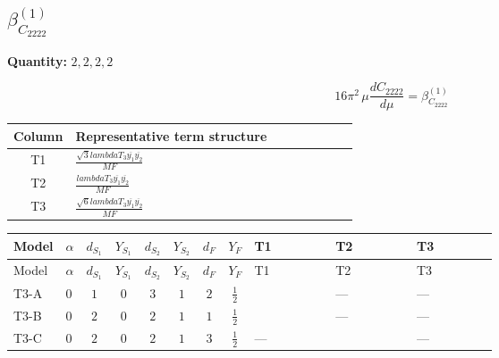 \documentclass[8pt]{article}
\begin{document}
\begin{landscape}
\section*{$\beta_{C_{2222}}^{(1)}$}
\noindent\textbf{Quantity: }$\mathrm{2,2,2,2}$\par\smallskip
\[16\pi^2\,\mu\frac{d C_{2222}}{d\mu}=\beta_{C_{2222}}^{(1)}\]
\begin{center}
\begin{tabular}{@{}c >{\raggedright\arraybackslash}p{0.82\linewidth}@{}}
\toprule
Column & Representative term structure \\
\midrule
T1 & \(\displaystyle \frac{\sqrt{3} lambdaT_{3} \overline{y_{1}} \overline{y_{2}}}{MF}\) \\
\midrule
T2 & \(\displaystyle \frac{lambdaT_{3} \overline{y_{1}} \overline{y_{2}}}{MF}\) \\
\midrule
T3 & \(\displaystyle \frac{\sqrt{6} lambdaT_{3} \overline{y_{1}} \overline{y_{2}}}{MF}\) \\
\midrule
\bottomrule
\end{tabular}
\end{center}
\smallskip
\tiny
\begin{longtable}{@{}llcccccc >{\raggedright\arraybackslash}p{0.21\linewidth} >{\raggedright\arraybackslash}p{0.21\linewidth} >{\raggedright\arraybackslash}p{0.21\linewidth}@{}}
\toprule
Model & $\alpha$ & $d_{S_1}$ & $Y_{S_1}$ & $d_{S_2}$ & $Y_{S_2}$ & $d_F$ & $Y_F$ & T1 & T2 & T3 \\
\midrule
\endfirsthead
\toprule
Model & $\alpha$ & $d_{S_1}$ & $Y_{S_1}$ & $d_{S_2}$ & $Y_{S_2}$ & $d_F$ & $Y_F$ & T1 & T2 & T3 \\
\midrule
\endhead
T3-A & $0$ & $1$ & $0$ & $3$ & $1$ & $2$ & $\frac{1}{2}$ & \scriptsize\adjustbox{max width=\linewidth}{$\begin{gathered} - \frac{2 \sqrt{3} lambdaT_{3} \overline{y_{1}} \overline{y_{2}}}{3 MF}\end{gathered}$} & --- & --- \\
\midrule
T3-B & $0$ & $2$ & $0$ & $2$ & $1$ & $1$ & $\frac{1}{2}$ & \scriptsize\adjustbox{max width=\linewidth}{$\begin{gathered} - \frac{2 \sqrt{3} lambdaT_{3} \overline{y_{1}} \overline{y_{2}}}{3 MF}\end{gathered}$} & --- & --- \\
\midrule
T3-C & $0$ & $2$ & $0$ & $2$ & $1$ & $3$ & $\frac{1}{2}$ & --- & \scriptsize\adjustbox{max width=\linewidth}{$\begin{gathered} \frac{2 lambdaT_{3} \overline{y_{1}} \overline{y_{2}}}{3 MF}\end{gathered}$} & --- \\

\end{longtable}
\end{landscape}
\end{document}
